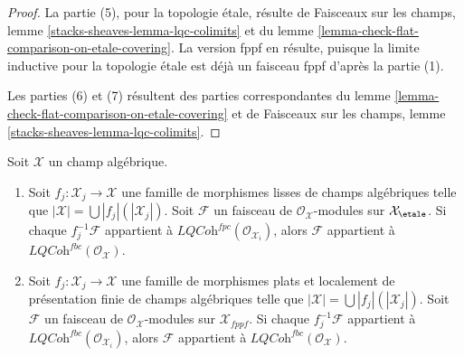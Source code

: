 \begin{proof}
\medskip\noindent
La partie (5), pour la topologie étale, résulte de
Faisceaux sur les champs, lemme \ref{stacks-sheaves-lemma-lqc-colimits} et du
lemme \ref{lemma-check-flat-comparison-on-etale-covering}.
La version fppf en résulte, puisque la limite inductive pour la topologie
étale est déjà un faisceau fppf d'après la partie (1).

\medskip\noindent
Les parties (6) et (7) résultent des parties correspondantes du
lemme \ref{lemma-check-flat-comparison-on-etale-covering} et de
Faisceaux sur les champs, lemme \ref{stacks-sheaves-lemma-lqc-colimits}.
\end{proof}

\begin{lemma}
\label{lemma-check-lqc-fbc-on-covering}
Soit $\mathcal{X}$ un champ algébrique.
\begin{enumerate}
\item Soit $f_j : \mathcal{X}_j \to \mathcal{X}$ une famille de morphismes
lisses de champs algébriques telle que
$|\mathcal{X}| =\bigcup |f_j|(|\mathcal{X}_j|)$.
Soit $\mathcal{F}$ un faisceau de $\mathcal{O}_\mathcal{X}$-modules
sur $\mathcal{X}_\etale$. Si chaque $f_j^{-1}\mathcal{F}$
appartient à $\textit{LQCoh}^{fpc}(\mathcal{O}_{\mathcal{X}_i})$, alors
$\mathcal{F}$ appartient à
$\textit{LQCoh}^{fbc}(\mathcal{O}_\mathcal{X})$.
\item Soit $f_j : \mathcal{X}_j \to \mathcal{X}$ une famille de morphismes plats
et localement de présentation finie de champs algébriques telle que
$|\mathcal{X}| =\bigcup |f_j|(|\mathcal{X}_j|)$.
Soit $\mathcal{F}$ un faisceau de $\mathcal{O}_\mathcal{X}$-modules
sur $\mathcal{X}_{fppf}$. Si chaque $f_j^{-1}\mathcal{F}$
appartient à $\textit{LQCoh}^{fbc}(\mathcal{O}_{\mathcal{X}_i})$, alors
$\mathcal{F}$ appartient à $\textit{LQCoh}^{fbc}(\mathcal{O}_\mathcal{X})$.
\end{enumerate}
\end{lemma}

